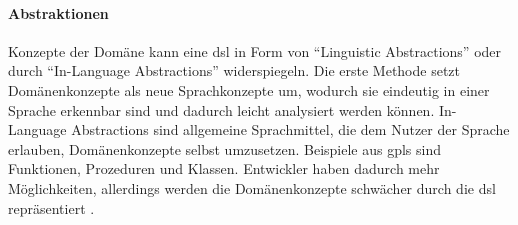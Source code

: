    \paragraph*{Abstraktionen}
    Konzepte der Domäne kann eine \gls{dsl} in Form von
    "`Linguistic Abstractions"' oder durch "`In-Language Abstractions"'
    widerspiegeln.
    Die erste Methode setzt Domänenkonzepte als neue Sprachkonzepte um,
    wodurch sie eindeutig in einer Sprache erkennbar sind
    und dadurch leicht analysiert werden können.
    In-Language Abstractions sind allgemeine Sprachmittel,
    die dem Nutzer der Sprache erlauben, Domänenkonzepte selbst umzusetzen.
    Beispiele aus \glspl{gpl} sind Funktionen, Prozeduren und Klassen.
    Entwickler haben dadurch mehr Möglichkeiten,
    allerdings werden die Domänenkonzepte schwächer durch die \gls{dsl}
    repräsentiert
    \cite[Kapitel 4.1.2]{voelter:DslEngineering}.